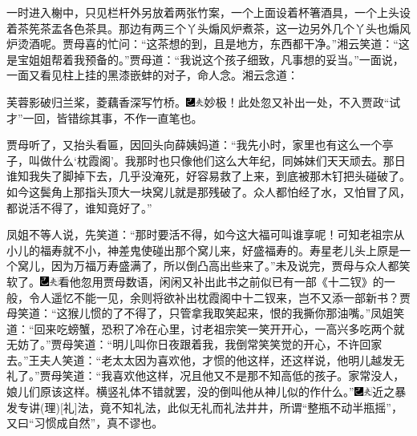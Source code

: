 一时进入榭中，只见栏杆外另放着两张竹案，一个上面设着杯箸酒具，一个上头设着茶筅茶盂各色茶具。那边有两三个丫头煽风炉煮茶，这一边另外几个丫头也煽风炉烫酒呢。贾母喜的忙问：``这茶想的到，且是地方，东西都干净。''湘云笑道：``这是宝姐姐帮着我预备的。''贾母道：``我说这个孩子细致，凡事想的妥当。''一面说，一面又看见柱上挂的黑漆嵌蚌的对子，命人念。湘云念道：

芙蓉影破归兰桨，菱藕香深写竹桥。{\includegraphics[width=3mm]{../Images/00003}\includegraphics[width=3mm]{../Images/00012}\footnotesize \kaishu 妙极！此处忽又补出一处，不入贾政``试才''一回，皆错综其事，不作一直笔也。}

贾母听了，又抬头看匾，因回头向薛姨妈道：``我先小时，家里也有这么一个亭子，叫做什么`枕霞阁'。我那时也只像他们这么大年纪，同姊妹们天天顽去。那日谁知我失了脚掉下去，几乎没淹死，好容易救了上来，到底被那木钉把头碰破了。如今这鬓角上那指头顶大一块窝儿就是那残破了。众人都怕经了水，又怕冒了风，都说活不得了，谁知竟好了。''

凤姐不等人说，先笑道：``那时要活不得，如今这大福可叫谁享呢！可知老祖宗从小儿的福寿就不小，神差鬼使碰出那个窝儿来，好盛福寿的。寿星老儿头上原是一个窝儿，因为万福万寿盛满了，所以倒凸高出些来了。''未及说完，贾母与众人都笑软了。{\includegraphics[width=3mm]{../Images/00003}\includegraphics[width=3mm]{../Images/00012}\footnotesize \kaishu 看他忽用贾母数语，闲闲又补出此书之前似已有一部《十二钗》的一般，令人遥忆不能一见，余则将欲补出枕霞阁中十二钗来，岂不又添一部新书？}贾母笑道：``这猴儿惯的了不得了，只管拿我取笑起来，恨的我撕你那油嘴。''凤姐笑道：``回来吃螃蟹，恐积了冷在心里，讨老祖宗笑一笑开开心，一高兴多吃两个就无妨了。''贾母笑道：``明儿叫你日夜跟着我，我倒常笑笑觉的开心，不许回家去。''王夫人笑道：``老太太因为喜欢他，才惯的他这样，还这样说，他明儿越发无礼了。''贾母笑道：``我喜欢他这样，况且他又不是那不知高低的孩子。家常没人，娘儿们原该这样。横竖礼体不错就罢，没的倒叫他从神儿似的作什么。''{\includegraphics[width=3mm]{../Images/00003}\includegraphics[width=3mm]{../Images/00012}\footnotesize \kaishu 近之暴发专讲{(理)}{[}礼{]}法，竟不知礼法，此似无礼而礼法井井，所谓``整瓶不动半瓶摇''，又曰``习惯成自然''，真不谬也。}

